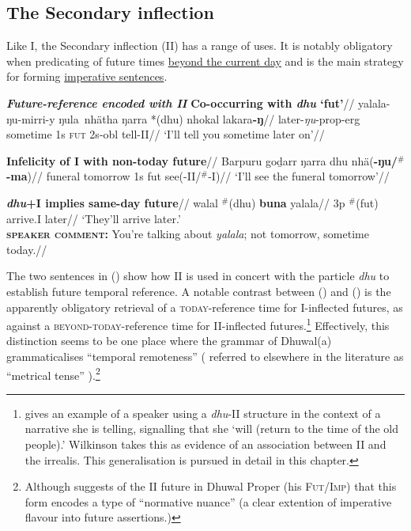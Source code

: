 \subsection{The Secondary inflection}\label{desc-ii}

Like \gls{I}, the Secondary inflection (\gls{II}) has a range of uses. It is notably obligatory when predicating of future times \underline{beyond the current day} and is the main strategy for forming \underline{imperative sentences}.

\pex{} \textbf{\textit{Future-reference encoded with \gls{II}}}
\a{}\begingl\glpreamble \textbf{Co-occurring with \textit{dhu} `\gls{fut}'}//
\gla yalala-ŋu-mirri-y ŋula~nhätha ŋarra *(dhu) nhokal lakara\textbf{-ŋ}//
\glb later-\textit{ŋu}-\gls{prop}-\gls{erg} sometime 1s \textsc{fut} 2s-\gls{obl} tell-\gls{II}//
\glft`I'll tell you sometime later on'//
\endgl

\a\begingl\glpreamble\textbf{ Infelicity of \gls{I} with non-today future}//
\gla Barpuru goḏarr ŋarra dhu nhä(\textbf{-ŋu/$^\#$-ma})//
\glb funeral tomorrow 1s \gls{fut} see(-\gls{II}/$^\#$-\gls{I})//
\glft `I'll see the funeral tomorrow'\trailingcitation{[AW~20180730]}//\endgl

\a\begingl\glpreamble\textbf{\textit{dhu}+\gls{I} implies same-day future}//
\gla walal $^\#$(dhu) \textbf{buna} yalala//
\glb 3p $^\#$(\gls{fut}) arrive.\gls{I} later//
\glft`They'll arrive later.'\\
\textsc{\textbf{speaker comment:}} You're talking about \textit{yalala}; not tomorrow, sometime today.//\endgl


\xe

\noindent The two sentences in () show how \gls{II} is used in concert with the particle \textit{dhu} to establish future temporal reference.
  A notable contrast between () and () is the apparently obligatory retrieval of a \textsc{today}-reference time for \gls{I}-inflected futures, as against a  \textsc{beyond-today}-reference time for \gls{II}-inflected futures.\footnote{\citet[347]{Wilkinson1991} gives an example of a speaker using a \textit{dhu}-\gls{II} structure in the context of a narrative she is telling, signalling that she `will (return to the time of the old people).' Wilkinson takes this as evidence of an association between \gls{II} and the irrealis. This generalisation is pursued in detail in this chapter.} Effectively, this distinction seems to be one place where the grammar of Dhuwal(a) grammaticalises ``temporal remoteness'' (\citealt{Comrie1985,Dahl1985} referred to elsewhere in the literature as ``metrical tense'' \citealp[\textit{e.g.},][204]{Chung}).\footnote{Although \citet[39]{Heath1980} suggests of the \gls{II} future in Dhuwal Proper (his \textsc{Fut/Imp}) that this form encodes a type of ``normative nuance'' (a clear extention of imperative flavour into future assertions.)}


